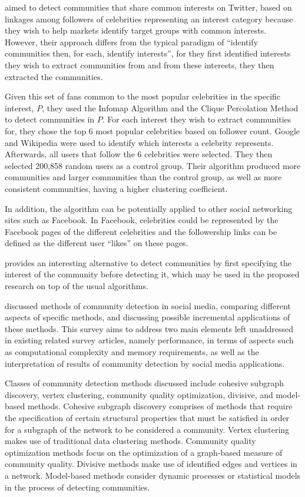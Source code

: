  aimed to detect communities that share common interests on Twitter, based on linkages among followers of celebrities representing an interest category because they wish to help markets identify target groups with common interests. However, their approach differs from the typical  paradigm of ``identify communities then, for each, identify interests'', for they first identified interests they wish to extract communities from and from these interests, they then extracted the communities. 

Given this set of fans common to the most popular celebrities in the specific interest, $P$, they used the Infomap Algorithm and the Clique Percolation Method to detect communities in $P$. For each interest they wish to extract communities for, they chose the top 6 most popular celebrities based on follower count. Google and Wikipedia were used to identify which interests a celebrity represents. Afterwards, all users that follow the 6 celebrities were selected. They then selected 200,858 random users as a control group. Their algorithm produced more communities and larger communities than the control group, as well as more consistent communities, having a higher clustering coefficient. 

In addition, the algorithm can be potentially applied to other social networking sites such as Facebook. In Facebook, celebrities could be represented by the Facebook pages of the different celebrities and the followership links can be defined as the different user ``likes'' on these pages.

 provides an interesting alternative to detect communities by first specifying the interest of the community before detecting it, which may be used in the proposed research on top of the usual algorithms.

 discussed methods of community detection in social media, comparing different aspects of specific methods, and discussing possible incremental applications of these methods. This survey aims to address two main elements left unaddressed in existing related survey articles, namely performance, in terms of aspects such as computational complexity and memory requirements, as well as the interpretation of results of community detection by social media applications.

Classes of community detection methods discussed include cohesive subgraph discovery, vertex clustering, community quality optimization, divisive, and model-based methods. Cohesive subgraph discovery comprises of methods that require the specification of certain structural properties that must be satisfied in order for a subgraph of the network to be considered a community. Vertex clustering makes use of traditional data clustering methods. Community quality optimization methods focus on the optimization of a graph-based measure of community quality. Divisive methods make use of identified edges and vertices in a network. Model-based methods consider dynamic processes or statistical models in the process of detecting communities.

